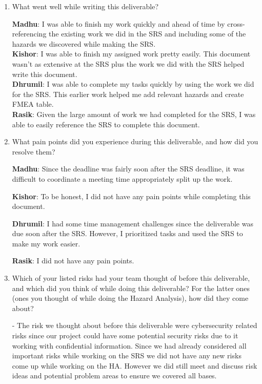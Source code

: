 \documentclass{article}
\begin{document}
\begin{enumerate}
    \item What went well while writing this deliverable?
    
    \textbf{Madhu}: I was able to finish my work quickly and ahead of time by cross-referencing the existing work we did in the SRS and including some of the hazards we discovered while making the SRS. 
    \\
    \textbf{Kishor}: I was able to finish my assigned work pretty easily. This document wasn't as extensive at the SRS plus the work we did with the SRS helped write this document.
    \\
    \textbf{Dhrumil}: I was able to complete my tasks quickly by using the work we did for the SRS. This earlier work helped me add relevant hazards and create FMEA table.
    \\
    \textbf{Rasik}: Given the large amount of work we had completed for the SRS, I was able to easily reference the SRS to complete this document. 
    
    \item What pain points did you experience during this deliverable, and how
    did you resolve them?

    \textbf{Madhu}: Since the deadline was fairly soon after the SRS deadline, it was difficult to coordinate a meeting time appropriately split up the work. 
    
    \textbf{Kishor}: To be honest, I did not have any pain points while completing this document.
    
    \textbf{Dhrumil}: I had some time management challenges since the deliverable was due soon after the SRS. However, I prioritized tasks and used the SRS to make my work easier.

    \textbf{Rasik}: I did not have any pain points.
    
    \item Which of your listed risks had your team thought of before this
    deliverable, and which did you think of while doing this deliverable? For
    the latter ones (ones you thought of while doing the Hazard Analysis), how
    did they come about?

    - The risk we thought about before this deliverable were cybersecurity related risks since our project could have some potential security risks due to it working with confidential information. Since we had already considered all important risks while working on the SRS we did not have any new risks come up while working on the HA. However we did still meet and discuss risk ideas and potential problem areas to ensure we covered all bases.


\end{enumerate}
\end{document}

